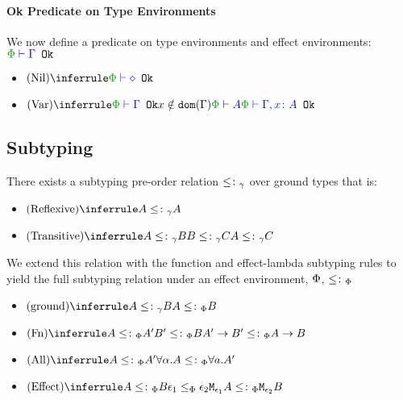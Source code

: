 \documentclass{report}
\begin{document}
\paragraph{Ok Predicate on Type Environments}
We now define a predicate on type environments and effect environments: $\oke{\P}{\G}$

\begin{itemize}
    \item $\ntreerulez{Nil}{\oke{\P}{\nil}}$
    \item $\ntreeruleIII{Var}{\oke{\P}{\G}}{ x\notin\dom{\G}}{ \wellformed{\P}{A}}{\oke{\P}{\gax}}$
\end{itemize}



\subsection{Subtyping}
    There exists a subtyping pre-order relation $\subtype_{\ground}$ over ground types that is:
    \begin{itemize}
        \item $\ntreerulez{Reflexive}{A \subtype_{\ground} A}$
        \item $\ntreeruleII{Transitive}{A \subtype_{\ground} B }{ B \subtype_{\ground} C}{A \subtype_{\ground} C}$
    \end{itemize}

    We extend this relation with the function and effect-lambda subtyping rules to yield the full subtyping relation under an effect environment, $\P$, $\subtypep$

    \begin{itemize}
        \item $\ntreeruleI{ground}{A \subtype_{\ground} B}{A \subtypep B}$
        \item $\ntreeruleII{Fn}{A \subtypep A' }{ B' \subtypep B }{\fntype{A'}{B'} \subtypep \ab}$
        \item $\ntreeruleI{All}{A\subtypep A'}{\all{\a}{A}\subtypep\all{a}{A'}}$
        \item $\ntreeruleII{Effect}{A\subtypep B}{ \e_1\subeffectp\e_2}{\M{\e_1}{A}\subtypep\M{\e_2}{B}}$
    \end{itemize}
\end{document}
